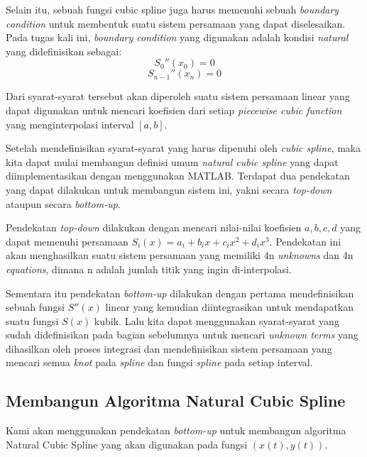 \documentclass[journal,12pt,onecolumn,a4paper]{IEEEtran}
\begin{document}
Selain itu, sebuah fungsi cubic spline juga harus memenuhi sebuah \emph{boundary condition} untuk membentuk suatu sistem persamaan yang dapat diselesaikan. Pada tugas kali ini, \emph{boundary condition} yang digunakan adalah kondisi \emph{natural} yang didefinisikan sebagai:
\begin{equation}
	S_0''(x_0) = 0
\end{equation}
\begin{equation}
	S_{n-1}''(x_n) = 0
\end{equation}

Dari syarat-syarat tersebut akan diperoleh suatu sistem persamaan linear yang dapat digunakan untuk mencari koefisien dari setiap \emph{piecewise cubic function} yang menginterpolasi interval \([a, b]\).

Setelah mendefinisikan syarat-syarat yang harus dipenuhi oleh \emph{cubic spline}, maka kita dapat mulai membangun definisi umum \emph{natural cubic spline} yang dapat diimplementasikan dengan menggunakan MATLAB. Terdapat dua pendekatan yang dapat dilakukan untuk membangun sistem ini, yakni secara \emph{top-down} ataupun secara \emph{bottom-up}.

Pendekatan \emph{top-down} dilakukan dengan mencari nilai-nilai koefisien \(a, b, c, d\) yang dapat memenuhi persamaan \(S_i(x) = a_i + b_ix + c_ix^2 + d_ix^3\). Pendekatan ini akan menghasilkan suatu sistem persamaan yang memiliki 4n \emph{unknowns} dan 4n \emph{equations}, dimana n adalah jumlah titik yang ingin di-interpolasi.

Sementara itu pendekatan \emph{bottom-up} dilakukan dengan pertama mendefinisikan sebuah fungsi \(S''(x)\) linear yang kemudian diintegrasikan untuk mendapatkan suatu fungsi \(S(x)\) kubik. Lalu kita dapat menggunakan syarat-syarat yang sudah didefinisikan pada bagian sebelumnya untuk mencari \emph{unknown terms} yang dihasilkan oleh proses integrasi dan mendefinisikan sistem persamaan yang mencari semua \emph{knot} pada \emph{spline} dan fungsi \emph{spline} pada setiap interval.

\subsection{Membangun Algoritma Natural Cubic Spline}
Kami akan menggunakan pendekatan \emph{bottom-up} untuk membangun algoritma Natural Cubic Spline yang akan digunakan pada fungsi \((x(t), y(t))\).
\end{document}
